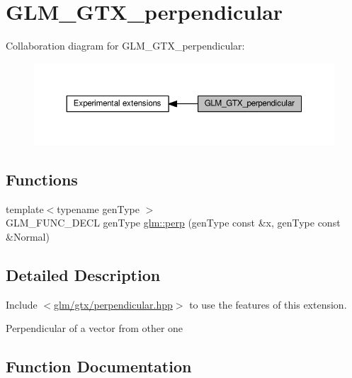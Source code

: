 \hypertarget{group__gtx__perpendicular}{}\section{G\+L\+M\+\_\+\+G\+T\+X\+\_\+perpendicular}
\label{group__gtx__perpendicular}
Collaboration diagram for G\+L\+M\+\_\+\+G\+T\+X\+\_\+perpendicular\+:
\nopagebreak
\begin{figure}[H]
\begin{center}
\leavevmode
\includegraphics[width=350pt]{d8/dd5/group__gtx__perpendicular}
\end{center}
\end{figure}
\subsection*{Functions}
\begin{DoxyCompactItemize}
\item 
{\footnotesize template$<$typename gen\+Type $>$ }\\G\+L\+M\+\_\+\+F\+U\+N\+C\+\_\+\+D\+E\+CL gen\+Type \hyperlink{group__gtx__perpendicular_ga264cfc4e180cf9b852e943b35089003c}{glm\+::perp} (gen\+Type const \&x, gen\+Type const \&Normal)
\end{DoxyCompactItemize}


\subsection{Detailed Description}
Include $<$\hyperlink{perpendicular_8hpp}{glm/gtx/perpendicular.\+hpp}$>$ to use the features of this extension.

Perpendicular of a vector from other one 

\subsection{Function Documentation}
\mbox{\label{group__gtx__perpendicular_ga264cfc4e180cf9b852e943b35089003c}} 
